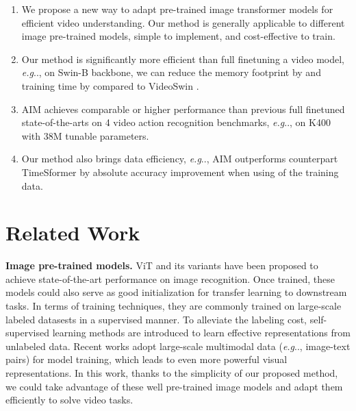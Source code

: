 \documentclass{article} \usepackage{iclr2023_conference,times}
\makeatletter
\DeclareRobustCommand\onedot{\futurelet\@let@token\@onedot}
\def\@onedot{\ifx\@let@token.\else.\null\fi\xspace}
\def\eg{\emph{e.g}\onedot} \def\Eg{\emph{E.g}\onedot}
\makeatother
\begin{document}
\setlength{\leftmargini}{12pt}
	\begin{enumerate}
\item We propose a new way to adapt pre-trained image transformer models for efficient video understanding. Our method is generally applicable to different image pre-trained models, simple to implement, and cost-effective to train.
\item Our method is significantly more efficient than full finetuning a video model, \eg,
		on Swin-B backbone, we can reduce the memory footprint by  and training time by  compared to VideoSwin \citep{liu2022videoswin}.
		\item AIM achieves comparable or higher performance than previous full finetuned state-of-the-arts on 4 video action recognition benchmarks, \eg,  on K400 with 38M tunable parameters.
\item Our method also brings data efficiency,  \eg, AIM outperforms counterpart TimeSformer \citep{timesformer} by  absolute accuracy improvement when using   of the training data.
	\end{enumerate}
	
	\section{Related Work}
	
	\textbf{Image pre-trained models.} 
ViT \citep{vit} and its variants \citep{liu2021swin, wang2021pyramidvit, yuan2021tokenstotoken, dong2022cswin} have been proposed to achieve state-of-the-art performance on image recognition. 
	Once trained, these models could also serve as good initialization for transfer learning to downstream tasks.
	In terms of training techniques, they are commonly trained on large-scale labeled datasests \citep{deng2009imagenet,jft300m,zhai_cvpr2022_scalingvit} in a supervised manner.
To alleviate the labeling cost, self-supervised learning methods \citep{mocov3,beit,zhou2021ibot,mae,xie2022simmim} are introduced to learn effective representations from unlabeled data. 
	Recent works \citep{clip, align, yuan2021florence,beitv3} adopt large-scale multimodal data (\eg, image-text pairs) for model training, which leads to even more powerful visual representations. 
In this work, thanks to the simplicity of our proposed method, we could take advantage of these well pre-trained image models and adapt them efficiently to solve video tasks.
	
\end{document}
